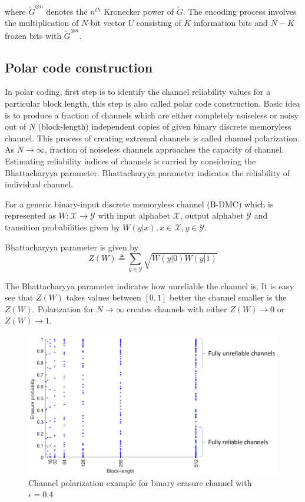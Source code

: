 where $\utilde{G}^{\otimes n}$ denotes the $n^{th}$ Kronecker power of $\utilde{G}$. The encoding process involves the multiplication of $N$-bit vector $U$ consisting of $K$ information bits and $N-K$ frozen bits with $\utilde{G}^{\otimes n}$.

\subsection{Polar code construction} \label{CodeConstruction}
In polar coding, first step is to identify the channel reliability values for a particular block length, this step is also called polar code construction. Basic idea  is to produce a fraction of channels which are either completely noiseless or noisy out of $N$ (block-length) independent copies of given binary discrete memoryless channel. This process of creating extremal channels is called channel polarization. As $N\to\infty$, fraction of noiseless channels approaches the capacity of channel. Estimating reliability indices of channels is carried by considering the Bhattacharyya parameter\cite{Arikan}. Bhattacharyya parameter indicates the reliability of individual channel.
 
For a generic binary-input discrete memoryless channel (B-DMC) which is represented as $W \colon \mathcal{X} \to \mathcal{Y}$ with input alphabet $\mathcal{X}$, output alphabet $\mathcal{Y}$ and transition probabilities given by $W(y|x),x \in \mathcal{X}, y \in \mathcal{Y}$.

Bhattacharyya parameter is given by 
\begin{equation}
	Z(W) \triangleq \sum_{y \in \mathcal{Y}} \sqrt{W(y|0)W(y|1)}
\end{equation}

The Bhattacharyya parameter indicates how unreliable the channel is, It is easy see that $Z(W)$ takes values between $[0,1]$ better the channel smaller is the $Z(W)$. Polarization for $N \to \infty$ creates channels with either $Z(W) \to 0$ or $Z(W) \to 1$. 

\begin{figure}[h]
	\centering
	\includegraphics[width=1\textwidth]{./figures/channel_polarization_plot.pdf}
	\caption{Channel polarization example for binary erasure channel with $\epsilon = 0.4$}
	\label{fig:channelPolarizationPlot}
\end{figure}

